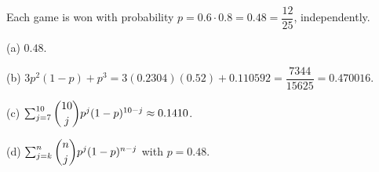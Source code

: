 Each game is won with probability $p=0.6\cdot0.8=0.48=\dfrac{12}{25}$, independently.

(a) $\boxed{0.48}$.

(b) $3p^2(1-p)+p^3=3(0.2304)(0.52)+0.110592=\dfrac{7344}{15625}=0.470016$.

(c) $\sum_{j=7}^{10}\dbinom{10}jp^j(1-p)^{10-j}\approx0.1410$.

(d) $\sum_{j=k}^n\dbinom njp^j(1-p)^{n-j}$ with $p=0.48$.
